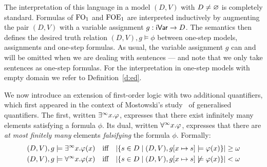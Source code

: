 The interpretation of this language in a model $(D,V)$ with $D \neq \varnothing$
is completely standard.
Formulas of $\mathrm{FO}_1$ and $\mathrm{FOE}_1$ are interpreted inductively by augmenting 
the pair $(D,V)$ with a variable assignment $g: \mathsf{iVar} \to D$. 
The semantics then defines the desired truth relation $(D, V),g \models \phi$ 
between one-step models, assignments and one-step formulas.
As usual, the variable assignment $g$ can and will be omitted when we are
dealing with sentences --- and note that we only take sentences as one-step 
formulas.
For the interpretation in one-step models with empty domain we refer to 
Definition~\ref{d:ed}.


We now introduce an extension of first-order logic with two additional
quantifiers, which first appeared in the context of Mostowski's 
study~\cite{Mostowski1957} of generalised quantifiers. 
The first, written $\exists^\infty x. \varphi$, expresses that there exist infinitely many
elements satisfying a formula $\phi$. 
Its dual, written $\forall^\infty x. \varphi$, expresses that there are \emph{at most 
finitely many} elements \emph{falsifying} the formula $\phi$. 
Formally:
\begin{equation}\label{eq:definfquant}
\begin{aligned}
 (D,V),g \models \qu x. \phi(x) & \quad\text{iff}\quad 
   |\{s\in D \mid (D, V),g[x\mapsto s] \models \phi(x) \}| \geq \om
\\ (D,V),g \models \dqu x. \phi(x) & \quad\text{iff}\quad 
   |\{s\in D \mid (D, V),g[x\mapsto s] \not\models \phi(x) \}| < \om
\end{aligned}
\end{equation}

